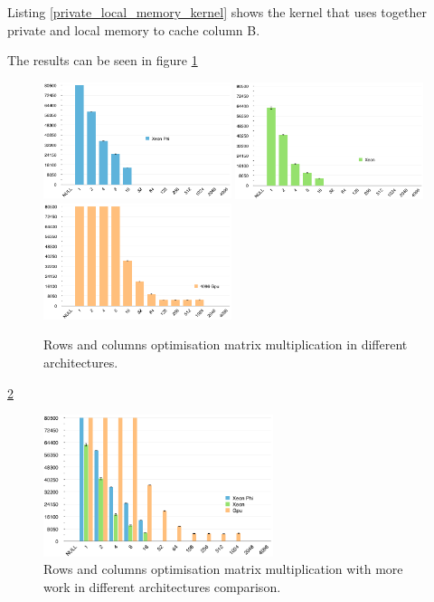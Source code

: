 
\par{Listing \ref{private_local_memory_kernel} shows the kernel that uses together private and local memory to cache column B.}



\par{The results can be seen in figure \ref{RowsCols}}

\begin{figure}[!h]
    \centering
    \includegraphics[width=0.49\textwidth]{figures/opt3_phi.png}
    \includegraphics[width=0.49\textwidth]{figures/opt3_cpu.png}
    \includegraphics[width=0.49\textwidth]{figures/opt3_gpu.png}
    \caption{Rows and columns optimisation matrix multiplication in different architectures.}
    \label{RowsCols}
\end{figure}

\par{\ref{RowsColsComp}}

\begin{figure}[!h]
    \centering
    \includegraphics[width=0.6\textwidth]{figures/opt3_comp.png}
    \caption{Rows and columns optimisation matrix multiplication with more work in different architectures comparison.}
    \label{RowsColsComp}
\end{figure}

